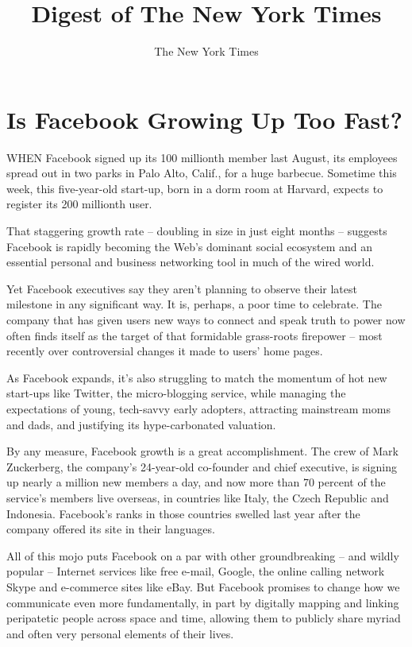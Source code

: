 \documentclass[12pt,a4paper,onecolumn]{article}
\title{Digest of The New York Times}
\author{The New York Times}
\begin{document}
\date{}
\tableofcontents
\pagebreak
\section{Is Facebook Growing Up Too Fast?}

WHEN Facebook signed up its 100 millionth member last August, its employees spread out in two parks
in Palo Alto, Calif., for a huge barbecue. Sometime this week, this five-year-old start-up, born in
a dorm room at Harvard, expects to register its 200 millionth user.

That staggering growth rate -- doubling in size in just eight months -- suggests Facebook is rapidly
becoming the Web's dominant social ecosystem and an essential personal and business networking tool
in much of the wired world.

Yet Facebook executives say they aren't planning to observe their latest milestone in any
significant way. It is, perhaps, a poor time to celebrate. The company that has given users new ways
to connect and speak truth to power now often finds itself as the target of that formidable
grass-roots firepower -- most recently over controversial changes it made to users' home pages.

As Facebook expands, it's also struggling to match the momentum of hot new start-ups like Twitter,
the micro-blogging service, while managing the expectations of young, tech-savvy early adopters,
attracting mainstream moms and dads, and justifying its hype-carbonated valuation.

By any measure, Facebook growth is a great accomplishment. The crew of Mark Zuckerberg, the
company's 24-year-old co-founder and chief executive, is signing up nearly a million new members a
day, and now more than 70 percent of the service's members live overseas, in countries like Italy,
the Czech Republic and Indonesia. Facebook's ranks in those countries swelled last year after the
company offered its site in their languages.

All of this mojo puts Facebook on a par with other groundbreaking -- and wildly popular -- Internet
services like free e-mail, Google, the online calling network Skype and e-commerce sites like eBay.
But Facebook promises to change how we communicate even more fundamentally, in part by digitally
mapping and linking peripatetic people across space and time, allowing them to publicly share myriad
and often very personal elements of their lives.
\end{document}
